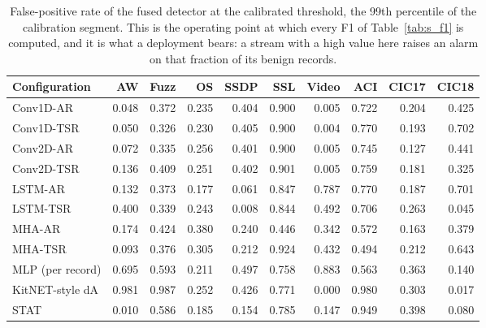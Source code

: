 \begin{table}[ht]\centering\footnotesize\setlength{\tabcolsep}{3.5pt}
\begin{tabular}{lrrrrrrrrr}
\hline
\textbf{Configuration} & \textbf{AW} & \textbf{Fuzz} & \textbf{OS} & \textbf{SSDP} & \textbf{SSL} & \textbf{Video} & \textbf{ACI} & \textbf{CIC17} & \textbf{CIC18}\\
\hline
Conv1D-AR & 0.048 & 0.372 & 0.235 & 0.404 & 0.900 & 0.005 & 0.722 & 0.204 & 0.425\\
Conv1D-TSR & 0.050 & 0.326 & 0.230 & 0.405 & 0.900 & 0.004 & 0.770 & 0.193 & 0.702\\
Conv2D-AR & 0.072 & 0.335 & 0.256 & 0.401 & 0.900 & 0.005 & 0.745 & 0.127 & 0.441\\
Conv2D-TSR & 0.136 & 0.409 & 0.251 & 0.402 & 0.901 & 0.005 & 0.759 & 0.181 & 0.325\\
LSTM-AR & 0.132 & 0.373 & 0.177 & 0.061 & 0.847 & 0.787 & 0.770 & 0.187 & 0.701\\
LSTM-TSR & 0.400 & 0.339 & 0.243 & 0.008 & 0.844 & 0.492 & 0.706 & 0.263 & 0.045\\
MHA-AR & 0.174 & 0.424 & 0.380 & 0.240 & 0.446 & 0.342 & 0.572 & 0.163 & 0.379\\
MHA-TSR & 0.093 & 0.376 & 0.305 & 0.212 & 0.924 & 0.432 & 0.494 & 0.212 & 0.643\\
MLP (per record) & 0.695 & 0.593 & 0.211 & 0.497 & 0.758 & 0.883 & 0.563 & 0.363 & 0.140\\
KitNET-style dA & 0.981 & 0.987 & 0.252 & 0.426 & 0.771 & 0.000 & 0.980 & 0.303 & 0.017\\
STAT & 0.010 & 0.586 & 0.185 & 0.154 & 0.785 & 0.147 & 0.949 & 0.398 & 0.080\\
\hline
\end{tabular}
\caption{False-positive rate of the fused detector at the calibrated threshold, the 99th percentile of the calibration segment. This is the operating point at which every F1 of Table~\ref{tab:s_f1} is computed, and it is what a deployment bears: a stream with a high value here raises an alarm on that fraction of its benign records.}\label{tab:s_fpr}
\end{table}

